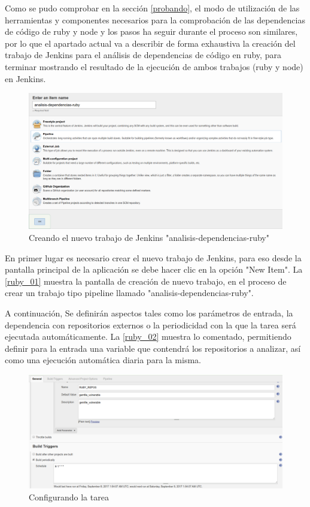 Como se pudo comprobar en la sección \ref{probando}, el modo de utilización de las herramientas y componentes necesarios para la comprobación de las dependencias de código de ruby y node y los pasos ha seguir durante el proceso son similares, por lo que el apartado actual va a describir de forma exhaustiva la creación del trabajo de Jenkins para el análisis de dependencias de código en ruby, para terminar mostrando el resultado de la ejecución de ambos trabajos (ruby y node) en Jenkins.

\begin{figure}[htbp]
	\centering
	\includegraphics[width=0.95\linewidth]
	{desarrollo/figuras/ruby_01.png}
	\caption{Creando el nuevo trabajo de Jenkins "analisis-dependencias-ruby"}
	\label{ruby_01}
\end{figure}

En primer lugar es necesario crear el nuevo trabajo de Jenkins, para eso desde la pantalla principal de la aplicación se debe hacer clic en la opción "New Item". La \autoref{ruby_01} muestra la pantalla de creación de nuevo trabajo, en el proceso de crear un trabajo tipo pipeline llamado "analisis-dependencias-ruby".

A continuación, Se definirán aspectos tales como los parámetros de entrada, la dependencia con repositorios externos o la periodicidad con la que la tarea será ejecutada automáticamente. La \autoref{ruby_02} muestra lo comentado, permitiendo definir para la entrada una variable que contendrá los repositorios a analizar, así como una ejecución automática diaria para la misma.

\begin{figure}[htbp]
	\centering
	\includegraphics[width=1.00\linewidth]
	{desarrollo/figuras/ruby_02.png}
	\caption{Configurando la tarea}
	\label{ruby_02}
\end{figure}

